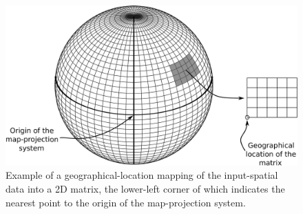 \begin{figure}
\centering

\includegraphics[width=1\textwidth]{04-framework_design_and_implementation/img/spatial_data_projection}

\caption{Example of a geographical-location mapping of the input-spatial data
into a 2D matrix, the lower-left corner of which indicates the nearest
point to the origin of the map-projection system.\label{fig:04-Spatial_data_location_mapping}}
\end{figure}


